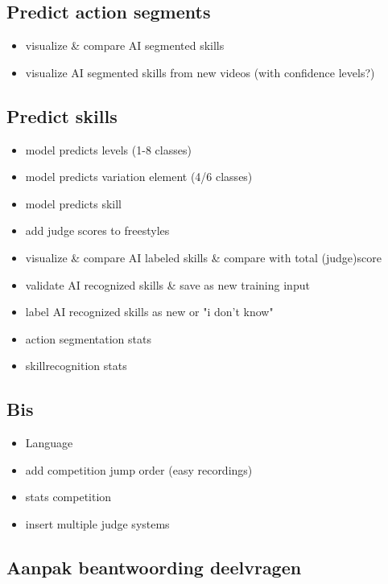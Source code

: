 \subsection{Predict action segments}

\begin{itemize}
    \item visualize \& compare AI segmented skills
    \item visualize AI segmented skills from new videos (with confidence levels?)
\end{itemize}


\subsection{Predict skills}

\begin{itemize}
    \item model predicts levels (1-8 classes)
    \item model predicts variation element (4/6 classes)
    \item model predicts skill
    \item add judge scores to freestyles
    \item visualize \& compare AI labeled skills \& compare with total (judge)score
    \item validate AI recognized skills \& save as new training input
    \item label AI recognized skills as new or "i don't know"
    \item action segmentation stats
    \item skillrecognition stats
\end{itemize}


\subsection{Bis}

\begin{itemize}
    \item Language
    \item add competition jump order (easy recordings)
    \item stats competition
    \item insert multiple judge systems
\end{itemize}



\subsection{Aanpak beantwoording deelvragen}
\label{subsec:methodologie-deelvragen}

